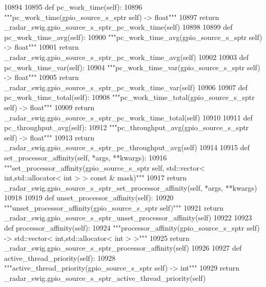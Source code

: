 \begin{DoxyCode}
{{{{{{{{{{{{{{{{{{{{{{{{{{{{{{{{{{10894 
10895     \textcolor{keyword}{def }pc_work_time(self):
10896         \textcolor{stringliteral}{"""pc\_work\_time(gpio\_source\_s\_sptr self) -> float"""}
10897         \textcolor{keywordflow}{return} \_radar\_swig.gpio\_source\_s\_sptr\_pc\_work\_time(self)
10898 
10899     \textcolor{keyword}{def }pc_work_time_avg(self):
10900         \textcolor{stringliteral}{"""pc\_work\_time\_avg(gpio\_source\_s\_sptr self) -> float"""}
10901         \textcolor{keywordflow}{return} \_radar\_swig.gpio\_source\_s\_sptr\_pc\_work\_time\_avg(self)
10902 
10903     \textcolor{keyword}{def }pc_work_time_var(self):
10904         \textcolor{stringliteral}{"""pc\_work\_time\_var(gpio\_source\_s\_sptr self) -> float"""}
10905         \textcolor{keywordflow}{return} \_radar\_swig.gpio\_source\_s\_sptr\_pc\_work\_time\_var(self)
10906 
10907     \textcolor{keyword}{def }pc_work_time_total(self):
10908         \textcolor{stringliteral}{"""pc\_work\_time\_total(gpio\_source\_s\_sptr self) -> float"""}
10909         \textcolor{keywordflow}{return} \_radar\_swig.gpio\_source\_s\_sptr\_pc\_work\_time\_total(self)
10910 
10911     \textcolor{keyword}{def }pc_throughput_avg(self):
10912         \textcolor{stringliteral}{"""pc\_throughput\_avg(gpio\_source\_s\_sptr self) -> float"""}
10913         \textcolor{keywordflow}{return} \_radar\_swig.gpio\_source\_s\_sptr\_pc\_throughput\_avg(self)
10914 
10915     \textcolor{keyword}{def }set_processor_affinity(self, *args, **kwargs):
10916         \textcolor{stringliteral}{"""set\_processor\_affinity(gpio\_source\_s\_sptr self, std::vector< int,std::allocator< int > > const &
       mask)"""}
10917         \textcolor{keywordflow}{return} \_radar\_swig.gpio\_source\_s\_sptr\_set\_processor\_affinity(self, *args, **kwargs)
10918 
10919     \textcolor{keyword}{def }unset_processor_affinity(self):
10920         \textcolor{stringliteral}{"""unset\_processor\_affinity(gpio\_source\_s\_sptr self)"""}
10921         \textcolor{keywordflow}{return} \_radar\_swig.gpio\_source\_s\_sptr\_unset\_processor\_affinity(self)
10922 
10923     \textcolor{keyword}{def }processor_affinity(self):
10924         \textcolor{stringliteral}{"""processor\_affinity(gpio\_source\_s\_sptr self) -> std::vector< int,std::allocator< int > >"""}
10925         \textcolor{keywordflow}{return} \_radar\_swig.gpio\_source\_s\_sptr\_processor\_affinity(self)
10926 
10927     \textcolor{keyword}{def }active_thread_priority(self):
10928         \textcolor{stringliteral}{"""active\_thread\_priority(gpio\_source\_s\_sptr self) -> int"""}
10929         \textcolor{keywordflow}{return} \_radar\_swig.gpio\_source\_s\_sptr\_active\_thread\_priority(self)
}}}}}}}}}}}}}}}}}}}}}}}}}}}}}}}}}}
\end{DoxyCode}
